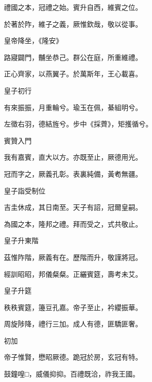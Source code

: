 \begin{pinyinscope}
 禮國之本，冠禮之始。賓升自西，維賓之位。



 於著於阼，維子之義，厥惟欽哉，敬以從事。



 皇帝降坐，《隆安》



 路寢闢門，黼坐恭己。群公在庭，所重維禮。



 正心齊家，以燕翼子。於萬斯年，王心載喜。



 皇子初行



 有來振振，月重輪兮。瑜玉在佩，綦組明兮。



 左徵右羽，德結旌兮。步中《採薺》，矩擭循兮。



 賓贊入門



 我有嘉賓，直大以方。亦既至止，厥德用光。



 冠而字之，厥義孔彰。表裏純備，黃耇無疆。



 皇子詣受制位



 吉圭休成，其日南至。天子有詔，冠爾皇嗣。



 為國之本，隆邦之禮。拜而受之，式共敬止。



 皇子升東階



 茲惟阼階，厥義有在。歷階而升，敬謹將冠。



 經訓昭昭，邦儀粲粲。正纚賓筵，壽考未艾。



 皇子升筵



 秩秩賓筵，籩豆孔嘉。帝子至止，衿纓振華。



 周旋陟降，禮行三加。成人有德，匪驕匪奢。



 初加



 帝子惟賢，懋昭厥德。跪冠於房，玄冠有特。



 鼓鐘喤□，威儀抑抑。百禮既洽，祚我王國。




\end{pinyinscope}
